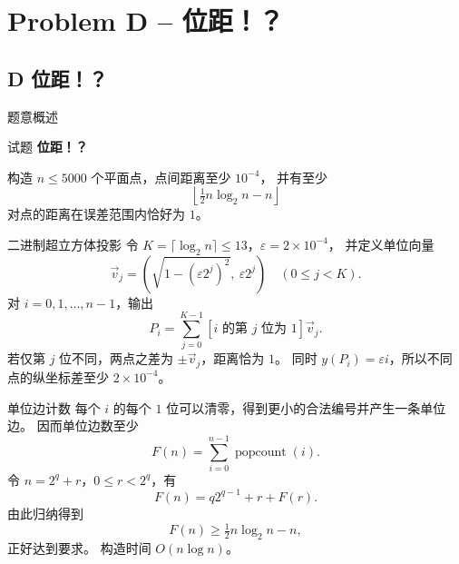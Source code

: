 \documentclass{beamer}
\newcommand{\TT}[1]{{\ttfamily #1}}
\newcommand{\BF}[1]{\textbf{#1}}
\begin{document}
{
\section[D]{Problem D -- 位距！？}
\subsection{D 位距！？}
\begin{frame}{题意概述}
  \begin{center}试题 \myboxiv{\BF{\TT{D}}} \BF{位距！？}\end{center}
  构造 $n\le5000$ 个平面点，点间距离至少 $10^{-4}$，
  并有至少
  \[
    \left\lfloor\tfrac12n\log_2n-n\right\rfloor
  \]
  对点的距离在误差范围内恰好为 $1$。
\end{frame}


\begin{frame}{二进制超立方体投影}
  令 $K=\lceil\log_2n\rceil\le13$，$\varepsilon=2\times10^{-4}$，
  并定义单位向量
  \[
    \vec v_j=\left(\sqrt{1-(\varepsilon2^j)^2},\ \varepsilon2^j\right)
    \quad(0\le j<K).
  \]
  对 $i=0,1,\ldots,n-1$，输出
  \[
    P_i=\sum_{j=0}^{K-1}[\text{$i$ 的第 $j$ 位为 }1]\vec v_j.
  \]
  若仅第 $j$ 位不同，两点之差为 $\pm\vec v_j$，距离恰为 $1$。
  同时 $y(P_i)=\varepsilon i$，所以不同点的纵坐标差至少
  $2\times10^{-4}$。
\end{frame}

\begin{frame}{单位边计数}
  每个 $i$ 的每个 $1$ 位可以清零，得到更小的合法编号并产生一条单位边。
  因而单位边数至少
  \[
    F(n)=\sum_{i=0}^{n-1}\operatorname{popcount}(i).
  \]
  令 $n=2^q+r$，$0\le r<2^q$，有
  \[
    F(n)=q2^{q-1}+r+F(r).
  \]
  由此归纳得到
  \[
    F(n)\ge\tfrac12n\log_2n-n,
  \]
  正好达到要求。
  构造时间 $O(n\log n)$。
\end{frame}}
\end{document}
